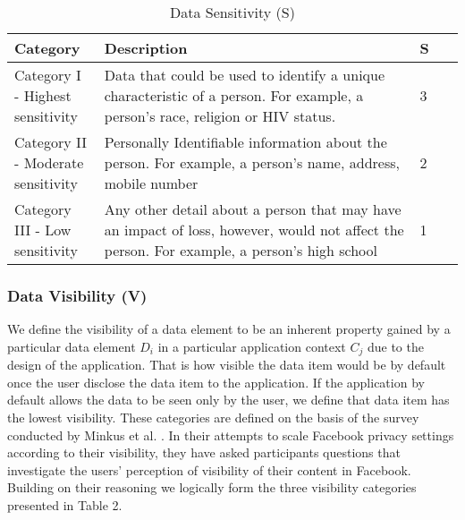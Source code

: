\documentclass[10pt]{article}
\begin{document}
\begin{center}
\begin{table}[htbp]
\caption{Data Sensitivity (S)}
\begin{center}
\begin{adjustbox}{width=0.5\textwidth} 
\begin{tabular}{|p{0.2\linewidth}|p{0.7\linewidth}|p{0.1\linewidth}|} 
\hline
Category & Description & S \\
\hline
Category I - Highest sensitivity & Data that could be used to identify a unique characteristic of a person. For example, a person's race, religion or HIV status. & 3 \\
\hline
Category II - Moderate sensitivity & Personally Identifiable information about the person. For example, a person's name, address, mobile number & 2 \\
\hline
Category III - Low sensitivity & Any other detail about a person that may have an impact of loss, however, would not affect the person. For example, a person's high school & 1 \\
\hline
\end{tabular}
\end{adjustbox}
\end{center}
\end{table}
\end{center} 

\subsubsection{Data Visibility (V)} 

We define the visibility of a data element to be an inherent property gained by a particular data element \textit{$D_i$} in a particular application context \textit{$C_j$} due to the design of the application. That is how visible the data item would be by default once the user disclose the data item to the application. If the application by default allows the data to be seen only by the user, we define that data item has the lowest visibility. These categories are defined on the basis of the survey conducted by Minkus et al. \cite{minkus2014scale}. In their attempts to scale Facebook privacy settings according to their visibility, they have asked participants questions that investigate the users' perception of visibility of their content in Facebook. Building on their reasoning we logically form the three visibility categories presented in Table 2.
\end{document}
